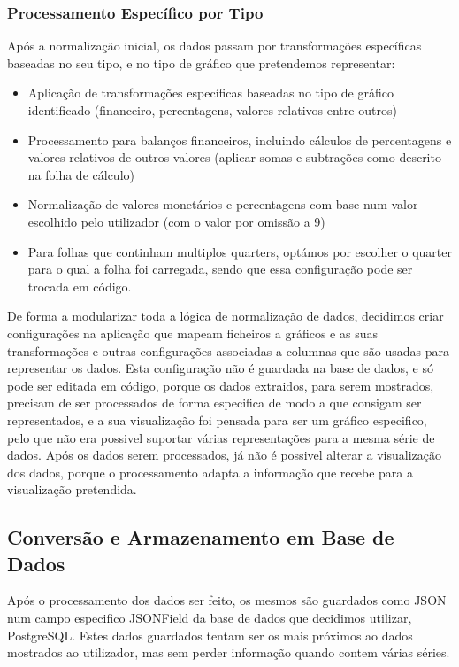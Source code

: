\subsubsection{Processamento Específico por Tipo}
Após a normalização inicial, os dados passam por transformações específicas baseadas no seu tipo, e no tipo de gráfico que pretendemos representar:
\begin{itemize}
    \item Aplicação de transformações específicas baseadas no tipo de gráfico identificado (financeiro, percentagens, valores relativos entre outros)
    \item Processamento para balanços financeiros, incluindo cálculos de percentagens e valores relativos de outros valores (aplicar somas e subtrações como descrito na folha de cálculo)
    \item Normalização de valores monetários e percentagens com base num valor escolhido pelo utilizador (com o valor por omissão a 9)
    \item Para folhas que continham multiplos quarters, optámos por escolher o quarter para o qual a folha foi carregada, sendo que essa configuração pode ser trocada em código.
\end{itemize}


De forma a modularizar toda a lógica de normalização de dados, decidimos criar configurações na aplicação que mapeam ficheiros a gráficos e as suas transformações e outras configurações associadas a columnas que são usadas para representar os dados. Esta configuração não é guardada na base de dados, e só pode ser editada em código, porque os dados extraidos, para serem mostrados, precisam de ser processados de forma especifica de modo a que consigam ser representados, e a sua visualização foi pensada para ser um gráfico especifico, pelo que não era possivel suportar várias representações para a mesma série de dados. Após os dados serem processados, já não é possivel alterar a visualização dos dados, porque o processamento adapta a informação que recebe para a visualização pretendida.

\subsection{Conversão e Armazenamento em Base de Dados}

Após o processamento dos dados ser feito, os mesmos são guardados como JSON num campo especifico JSONField da base de dados que decidimos utilizar, PostgreSQL. Estes dados guardados tentam ser os mais próximos ao dados mostrados ao utilizador, mas sem perder informação quando contem várias séries.

